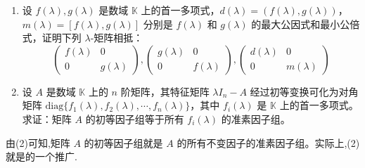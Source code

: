 \documentclass[../../main.tex]{subfiles}%
\begin{document}
\begin{theorem}\label{theorem:lambda-矩阵和初等因子的基本性质}
\begin{enumerate}[(1)]
\item 设 \(f(\lambda),g(\lambda)\) 是数域 \(\mathbb{K}\) 上的首一多项式，\(d(\lambda)=(f(\lambda),g(\lambda))\)，\(m(\lambda)=[f(\lambda),g(\lambda)]\) 分别是 \(f(\lambda)\) 和 \(g(\lambda)\) 的最大公因式和最小公倍式，证明下列 \(\lambda\)-矩阵相抵：
\[
\begin{pmatrix}
f(\lambda) & 0 \\
0 & g(\lambda)
\end{pmatrix}, 
\begin{pmatrix}
g(\lambda) & 0 \\
0 & f(\lambda)
\end{pmatrix}, 
\begin{pmatrix}
d(\lambda) & 0 \\
0 & m(\lambda)
\end{pmatrix}
\]

\item 设 \(A\) 是数域 \(\mathbb{K}\) 上的 \(n\) 阶矩阵，其特征矩阵 \(\lambda I_n - A\) 经过初等变换可化为对角矩阵 \(\mathrm{diag}\{f_1(\lambda),f_2(\lambda),\cdots,f_n(\lambda)\}\)，其中 \(f_i(\lambda)\) 是 \(\mathbb{K}\) 上的首一多项式。求证：矩阵 \(A\) 的初等因子组等于所有 \(f_i(\lambda)\) 的准素因子组。
\end{enumerate}
\end{theorem}
\begin{note}
由(2)可知,矩阵 \(A\) 的初等因子组就是 \(A\) 的所有不变因子的准素因子组。实际上,(2)就是的一个推广.
\end{note}
\end{document}
